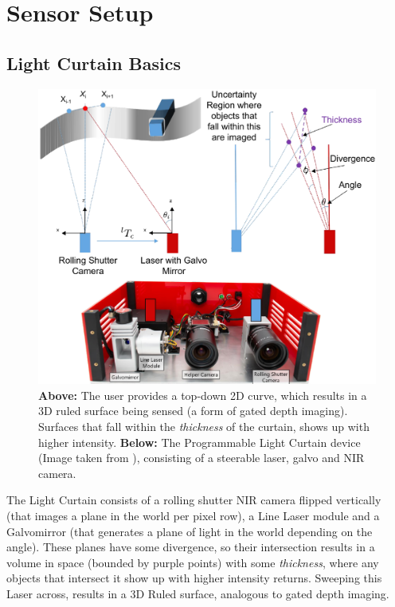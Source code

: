 
\section{Sensor Setup}

\subsection{Light Curtain Basics}

\begin{figure}[h]
   \centering
   \begin{minipage}{0.5\textwidth}
       \centering
       \includegraphics[width=1.0\textwidth]{figures/LC.pdf} %
   \end{minipage}\hfill
   \centering
   \caption{\textbf{Above:} The user provides a top-down 2D curve, which results in a 3D ruled surface being sensed (a form of gated depth imaging). Surfaces that fall within the \textit{thickness} of the curtain, shows up with higher intensity. \textbf{Below:}  The Programmable Light Curtain device (Image taken from \cite{bartels2019Agile}), consisting of a steerable laser, galvo and NIR camera.}
\end{figure}

The Light Curtain consists of a rolling shutter NIR camera flipped vertically (that images a plane in the world per pixel row), a Line Laser module and a Galvomirror (that generates a plane of light in the world depending on the angle). These planes have some divergence, so their intersection results in a volume in space (bounded by purple points) with some \textit{thickness}, where any objects that intersect it show up with higher intensity returns. Sweeping this Laser across, results in a 3D Ruled surface, analogous to gated depth imaging.


